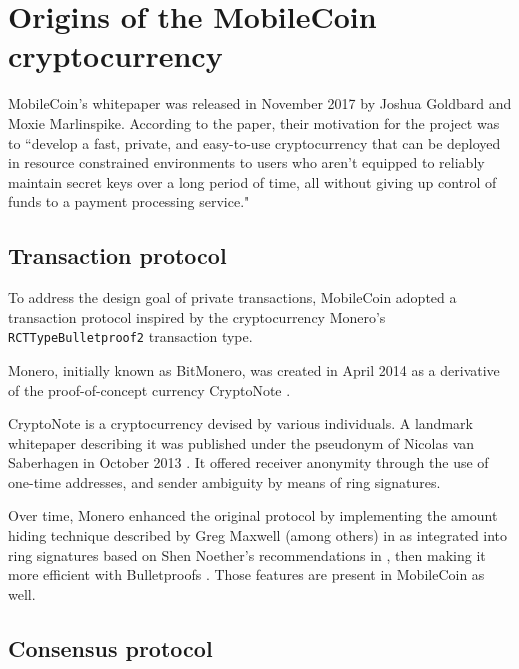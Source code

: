 \section{Origins of the MobileCoin cryptocurrency}

MobileCoin's whitepaper was released in November 2017 by Joshua Goldbard and Moxie Marlinspike. According to the paper, their motivation for the project was to ``develop a fast, private, and easy-to-use cryptocurrency that can be deployed in resource constrained environments to users who aren't equipped to reliably maintain secret keys over a long period of time, all without giving up control of funds to a payment processing service." \cite{mobilecoin-whitepaper}%

\subsection{Transaction protocol}
\label{subsec:origins-tx-protocol}

To address the design goal of private transactions, MobileCoin adopted a transaction protocol inspired by the cryptocurrency Monero's {\tt RCTTypeBulletproof2} transaction type.

Monero, initially known as BitMonero, was created in April 2014 as a derivative of the proof-of-concept currency CryptoNote \cite{bitmonero-launched}.

CryptoNote is a cryptocurrency devised by various individuals. A landmark whitepaper describing it was published under the pseudonym of Nicolas van Saberhagen in October 2013 \cite{cryptoNoteWhitePaper}. It offered receiver anonymity through the use of one-time addresses, and sender ambiguity by means of ring signatures.

Over time, Monero enhanced the original protocol by implementing the amount hiding technique described by Greg Maxwell (among others) in \cite{Signatures2015BorromeanRS} as integrated into ring signatures based on Shen Noether's recommendations in \cite{MRL-0005-ringct}, then making it more efficient with Bulletproofs \cite{Bulletproofs_paper}. Those features are present in MobileCoin as well.


\subsection{Consensus protocol}

